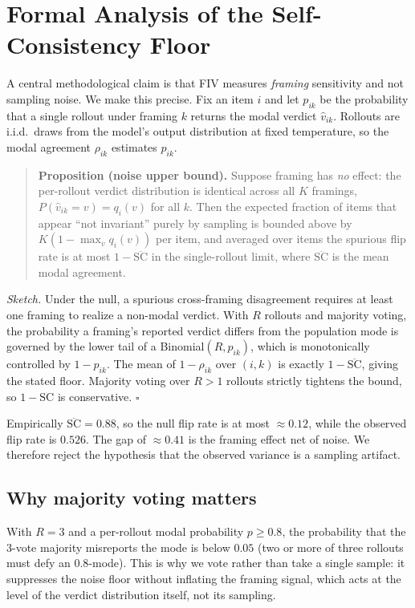 \documentclass[10pt]{article}
\begin{document}
\section{Formal Analysis of the Self-Consistency Floor}\label{sec:formal}
A central methodological claim is that FIV measures \emph{framing} sensitivity and not
sampling noise. We make this precise. Fix an item $i$ and let $p_{ik}$ be the probability
that a single rollout under framing $k$ returns the modal verdict $\hat v_{ik}$. Rollouts
are i.i.d.\ draws from the model's output distribution at fixed temperature, so the modal
agreement $\rho_{ik}$ estimates $p_{ik}$.

\begin{quote}\textbf{Proposition (noise upper bound).} Suppose framing has \emph{no} effect:
the per-rollout verdict distribution is identical across all $K$ framings,
$P(\hat v_{ik}=v)=q_i(v)$ for all $k$. Then the expected fraction of items that appear
``not invariant'' purely by sampling is bounded above by $K(1-\max_v q_i(v))$ per item,
and averaged over items the spurious flip rate is at most $1-\overline{\mathrm{SC}}$ in the
single-rollout limit, where $\overline{\mathrm{SC}}$ is the mean modal agreement.\end{quote}

\noindent\emph{Sketch.} Under the null, a spurious cross-framing disagreement requires at
least one framing to realize a non-modal verdict. With $R$ rollouts and majority voting, the
probability a framing's reported verdict differs from the population mode is governed by the
lower tail of a Binomial$(R,p_{ik})$, which is monotonically controlled by $1-p_{ik}$. The
mean of $1-\rho_{ik}$ over $(i,k)$ is exactly $1-\overline{\mathrm{SC}}$, giving the stated
floor. Majority voting over $R>1$ rollouts strictly tightens the bound, so $1-\mathrm{SC}$
is conservative. $\square$

\noindent Empirically $\overline{\mathrm{SC}}=0.88$, so the null flip rate is at most
$\approx 0.12$, while the observed flip rate is $0.526$. The gap of $\approx 0.41$ is the
framing effect net of noise. We therefore reject the hypothesis that the observed variance is
a sampling artifact.

\subsection{Why majority voting matters}
With $R=3$ and a per-rollout modal probability $p\geq 0.8$, the probability that the
3-vote majority misreports the mode is below $0.05$ (two or more of three rollouts must
defy an $0.8$-mode). This is why we vote rather than take a single sample: it suppresses the
noise floor without inflating the framing signal, which acts at the level of the verdict
distribution itself, not its sampling.
\end{document}
